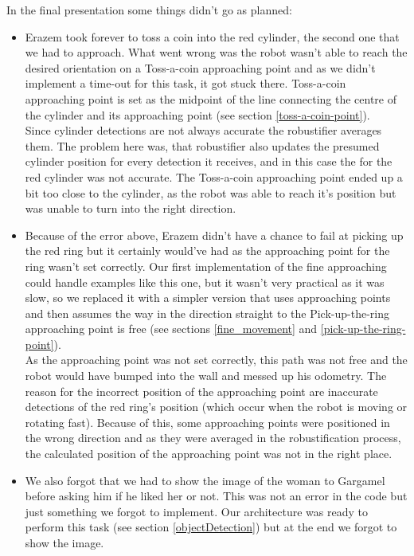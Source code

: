 \documentclass[12pt,a4paper]{article}
\begin{document}
	In the final presentation some things didn't go as planned:
	\begin{itemize}
		
		\item Erazem took forever to toss a coin into the red cylinder, the second one that we had to approach. What went wrong was the robot wasn't able to reach the desired orientation on a Toss-a-coin approaching point and as we didn't implement a time-out for this task, it got stuck there. Toss-a-coin approaching point is set as the midpoint of the line connecting the centre of the cylinder and its approaching point (see section \ref{toss-a-coin-point}). \\
		Since cylinder detections are not always accurate the robustifier averages them. The problem here was, that robustifier also updates the presumed cylinder position for every detection it receives, and in this case the  for the red cylinder was not accurate. The Toss-a-coin approaching point ended up a bit too close to the cylinder, as the robot was able to reach it's position but was unable to turn into the right direction. \\
		
		\item Because of the error above, Erazem didn't have a chance to fail at picking up the red ring but it certainly would've had as the approaching point for the ring wasn't set correctly. Our first implementation of the fine approaching could handle examples like this one, but it wasn't very practical as it was slow, so we replaced it with a simpler version that uses approaching points and then assumes the way in the direction straight to the Pick-up-the-ring approaching point is free (see sections \ref{fine_movement} and \ref{pick-up-the-ring-point}). \\
		As the approaching point was not set correctly, this path was not free and the robot would have bumped into the wall and messed up his odometry. The reason for the incorrect position of the approaching point are inaccurate detections of the red ring's position (which occur when the robot is moving or rotating fast). Because of this, some approaching points were positioned in the wrong direction and as they were averaged in the robustification process, the calculated position of the approaching point was not in the right place.
		
		\item We also forgot that we had to show the image of the woman to Gargamel before asking him if he liked her or not. This was not an error in the code but just something we forgot to implement. Our architecture was ready to perform this task (see section \ref{objectDetection}) but at the end we forgot to show the image.
		

\end{itemize}
\end{document}
